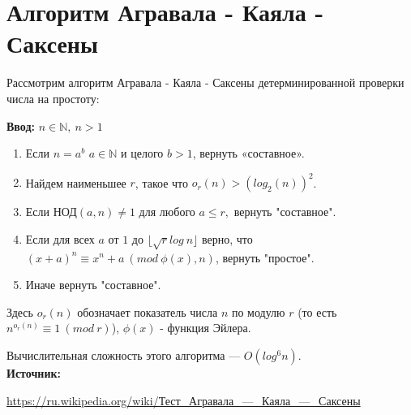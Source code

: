 \documentclass[12pt,a4paper]{scrartcl}
\begin{document}
	
\section{Алгоритм Агравала - Каяла - Саксены}

Рассмотрим алгоритм Агравала - Каяла - Саксены детерминированной проверки числа на простоту:

\textbf{Ввод: } $n \in \mathbb{N},\ n>1$
\begin{enumerate}
	\item Если $n=a^{b}$ $a \in \mathbb{N}$ и целого $b > 1$, вернуть «составное».
	\item Найдем наименьшее $r$, такое что $o_{r}(n)>(log_{2}(n))^{2}$.
	\item Если $\text{НОД} ( a , n ) \neq 1$ для любого $a \leq r,$ вернуть "составное".
	\item Если для всех $a$ от $1$ до $\lfloor \sqrt{r} log\ n \rfloor$ верно, что $(x+a)^{n} \equiv x^{n}+a\ (mod\ \phi(x), n)$, вернуть "простое".
	\item Иначе вернуть "составное".
\end{enumerate}

Здесь  $o_{r}(n)$ обозначает показатель числа $n$  по модулю $r$ (то есть $n^{o_{r}(n)} \equiv 1\ (mod\ r)$), $\phi(x)$ - функция Эйлера.

Вычислительная сложность этого алгоритма — $O(log^{6} n)$. \\

\textbf{Источник:}

\href{https://ru.wikipedia.org/wiki/%D0%A2%D0%B5%D1%81%D1%82_%D0%90%D0%B3%D1%80%D0%B0%D0%B2%D0%B0%D0%BB%D0%B0_%E2%80%94_%D0%9A%D0%B0%D1%8F%D0%BB%D0%B0_%E2%80%94_%D0%A1%D0%B0%D0%BA%D1%81%D0%B5%D0%BD%D1%8B}{https://ru.wikipedia.org/wiki/Тест\_Агравала\_—\_Каяла\_—\_Саксены}\\

	
\end{document}
